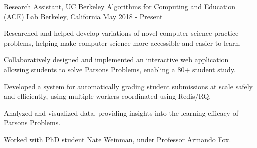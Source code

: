 \begin{cventries}
    \cventry
      {Research Assistant, UC Berkeley}
      {Algorithms for Computing and Education (ACE) Lab}
      {Berkeley, California}
      {May 2018 - Present}
      {
        \begin{cvitems}
          \item Researched and helped develop variations of novel computer science practice problems, helping make computer science more accessible and easier-to-learn.
          \item Collaboratively designed and implemented an interactive web application allowing students to solve Parsons Problems, enabling a 80+ student study. 
          \item Developed a system for automatically grading student submissions at scale safely and efficiently, using multiple workers coordinated using Redis/RQ.
          \item Analyzed and visualized data, providing insights into the learning efficacy of Parsons Problems.
          \item Worked with PhD student Nate Weinman, under Professor Armando Fox.
        \end{cvitems}  
      }

\end{cventries}
